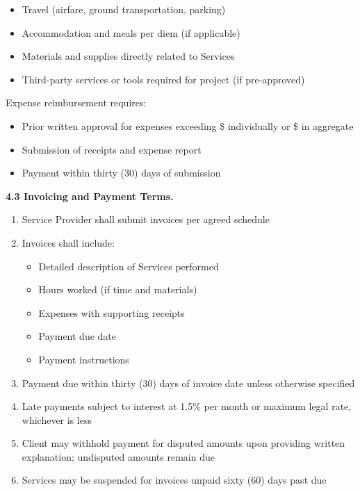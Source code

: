 \documentclass[11pt,a4paper]{article}
\begin{document}
\begin{itemize}
\item Travel (airfare, ground transportation, parking)
\item Accommodation and meals per diem (if applicable)
\item Materials and supplies directly related to Services
\item Third-party services or tools required for project (if pre-approved)
\end{itemize}

Expense reimbursement requires:
\begin{itemize}
\item Prior written approval for expenses exceeding \$\underline{\hspace{3cm}} individually or \$\underline{\hspace{3cm}} in aggregate
\item Submission of receipts and expense report
\item Payment within thirty (30) days of submission
\end{itemize}

\textbf{4.3 Invoicing and Payment Terms.}

\begin{enumerate}[label=\alph*)]
\item Service Provider shall submit invoices per agreed schedule
\item Invoices shall include:
\begin{itemize}
\item Detailed description of Services performed
\item Hours worked (if time and materials)
\item Expenses with supporting receipts
\item Payment due date
\item Payment instructions
\end{itemize}
\item Payment due within thirty (30) days of invoice date unless otherwise specified
\item Late payments subject to interest at 1.5\% per month or maximum legal rate, whichever is less
\item Client may withhold payment for disputed amounts upon providing written explanation; undisputed amounts remain due
\item Services may be suspended for invoices unpaid sixty (60) days past due
\end{enumerate}
\end{document}

